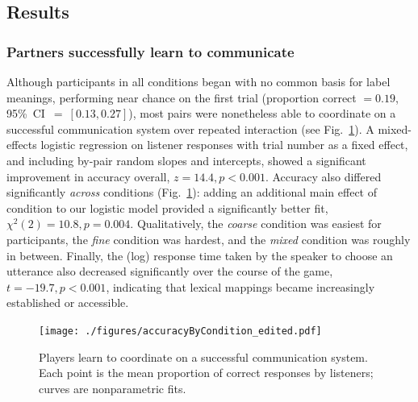 \subsection{Results}

\subsubsection{Partners successfully learn to communicate}

Although participants in all conditions began with no common basis for label meanings, performing near chance on the first trial (proportion correct $= 0.19$, 95\%~CI~$=~[0.13, 0.27]$), most pairs were nonetheless able to coordinate on a successful communication system over repeated interaction (see Fig.\ \ref{fig:context_accuracy}). 
A mixed-effects logistic regression on listener responses with trial number as a fixed effect, and including by-pair random slopes and intercepts, showed a significant improvement in accuracy overall, $z = 14.4, p < 0.001$. 
Accuracy also differed significantly \emph{across} conditions (Fig.\ \ref{fig:context_accuracy}): adding an additional main effect of condition to our logistic model provided a significantly better fit, $\chi^2(2) = 10.8, p = 0.004$. 
Qualitatively, the \emph{coarse} condition was easiest for participants, the \emph{fine} condition was hardest, and the \emph{mixed} condition was roughly in between. %
Finally, the (log) response time taken by the speaker to choose an utterance also decreased significantly over the course of the game, $t = -19.7, p < 0.001$, indicating that lexical mappings became increasingly established or accessible.

\begin{figure}[t]
\begin{center}
{\texttt{[image: ./figures/accuracyByCondition\_edited.pdf]}}
\vspace{-2ex}
{\caption{{Players learn to coordinate on a successful communication system. Each point is the mean proportion of correct responses by listeners; curves are nonparametric fits.  %
\label{fig:context_accuracy}}}}
\vspace{-3ex}
\end{center}
\end{figure}

